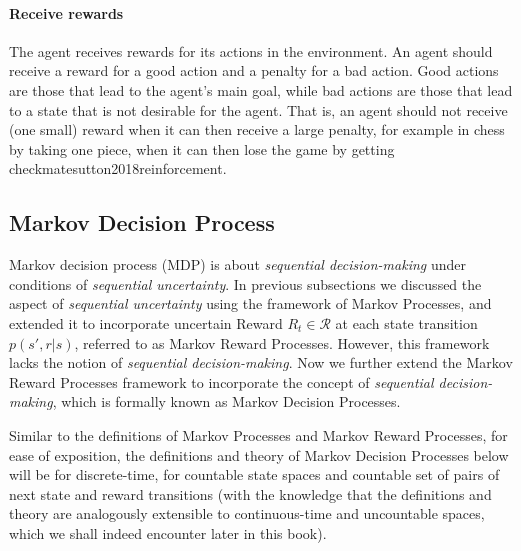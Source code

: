 \documentclass[../xlapes02]{subfiles}
\begin{document}
    \paragraph{Receive rewards}
    The agent receives rewards for its actions in the environment. An agent should receive a reward for a good action and a penalty for a bad action. Good actions are those that lead to the agent's main goal, while bad actions are those that lead to a state that is not desirable for the agent. That is, an agent should not receive (one small) reward when it can then receive a large penalty, for example in chess by taking one piece, when it can then lose the game by getting checkmate{sutton2018reinforcement}.

    \subsection{Markov Decision Process}\label{subsec:markov-decision-process}
    Markov decision process (MDP) is about \emph{sequential decision-making} under conditions of \emph{sequential uncertainty}. In previous subsections we discussed the aspect of \emph{sequential uncertainty} using the framework of Markov Processes, and extended it to incorporate uncertain Reward $R_t\in\mathcal{R}$ at each state transition $p(s',r|s)$, referred to as Markov Reward Processes. However, this framework lacks the notion of \emph{sequential decision-making}. Now we further extend the Markov Reward Processes framework to incorporate the concept of \emph{sequential decision-making}, which is formally known as Markov Decision Processes.


    Similar to the definitions of Markov Processes and Markov Reward Processes, for ease of exposition, the definitions and theory of Markov Decision Processes below will be for discrete-time, for countable state spaces and countable set of pairs of next state and reward transitions (with the knowledge that the definitions and theory are analogously extensible to continuous-time and uncountable spaces, which we shall indeed encounter later in this book).
\end{document}

